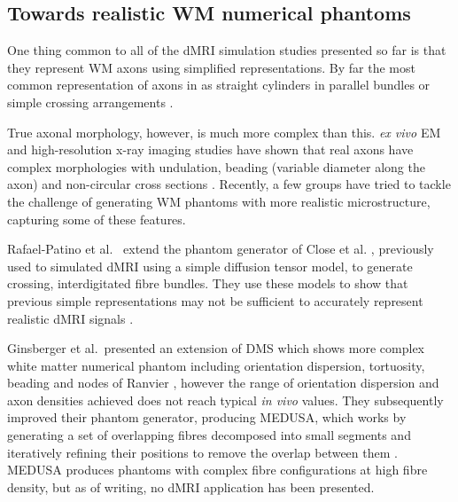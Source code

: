 \subsection{Towards realistic \acs{WM} numerical phantoms}
\label{sec:review_realistic_phantoms}
One thing common to all of the \ac{dMRI} simulation studies presented so far is that they represent \ac{WM} axons using simplified representations. By far the most common representation of axons in as straight cylinders in parallel bundles or simple crossing arrangements \cite{Rensonnet2018,Rensonnet2015,Nilsson2010,Alexander2010,Hall2009}.

True axonal morphology, however, is much more complex than this. \emph{ex vivo} \ac{EM} and high-resolution x-ray imaging studies have shown that real axons have complex morphologies with undulation, beading (variable diameter along the axon) and non-circular cross sections \cite{Abdollahzadeh2019,Lee2019b,Salo2018,Andersson2020}.
Recently, a few groups have tried to tackle the challenge of generating \ac{WM} phantoms with more realistic microstructure, capturing some of these features.

Rafael-Patino et al.\ \cite{Rafael-Patino2018} extend the phantom generator of Close et al. \cite{Close2009}, previously used to simulated \ac{dMRI} using a simple diffusion tensor model, to generate crossing, interdigitated fibre bundles. They use these models to show that previous simple representations may not be sufficient to accurately represent realistic \ac{dMRI} signals \cite{Rafael-patino2020}.

Ginsberger et al.\ presented an extension of \ac{DMS} which shows more complex white matter numerical phantom including orientation dispersion, tortuosity, beading and nodes of Ranvier \cite{Ginsburger2018}, however the range of orientation dispersion and axon densities achieved does not reach typical \emph{in vivo} values.
They subsequently improved their phantom generator, producing \ac{MEDUSA}, which works by generating a set of overlapping fibres decomposed into small segments and iteratively refining their positions to remove the overlap between them \cite{Ginsburger2019,Matuschke2019a}.
\ac{MEDUSA} produces phantoms with complex fibre configurations at high fibre density, but as of writing, no \ac{dMRI} application has been presented. 

